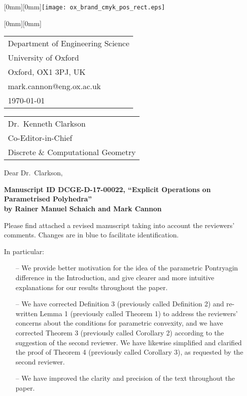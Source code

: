 \documentclass[11pt, a4paper]{article}
\begin{document}
\raisebox{-\height}[0mm][0mm]{\texttt{[image: ox\_brand\_cmyk\_pos\_rect.eps]}}

\hspace{105mm}%
\raisebox{-7.7mm}[0mm][0mm]{\begin{tabular}{@{}l@{}}
Department of Engineering Science\\
University of Oxford\\
Oxford, OX1 3PJ, UK\\
{mark.cannon@eng.ox.ac.uk}
\\
\today\rule{0pt}{25pt}
\end{tabular}}

\vspace{30mm}

\begin{tabular}{@{}l@{}} 
Dr.~Kenneth Clarkson\\
Co-Editor-in-Chief\\
Discrete \& Computational Geometry
\end{tabular}

\vspace{15mm}

\noindent Dear Dr.\ Clarkson,

\textbf{Manuscript ID DCGE-D-17-00022, ``Explicit Operations on Parametrised Polyhedra''\\
by Rainer Manuel Schaich and Mark Cannon}
 
Please find attached a revised manuscript taking into account the reviewers' comments. Changes are in blue to facilitate identification.

In particular:

\begin{itemize}
\item[--] We provide better motivation for the idea of the parametric Pontryagin difference in the Introduction, and give clearer and more intuitive explanations for our results throughout the paper.
\item[--] We have corrected Definition 3 (previously called Definition 2) and re-written Lemma 1 (previously called Theorem 1) to address the reviewers' concerns about the conditions for parametric convexity, and we have corrected Theorem 3 (previously called Corollary 2) according to the suggestion of the second reviewer. We have likewise simplified and clarified the proof of Theorem 4 (previously called Corollary 3), as requested by the second reviewer.
\item[--] We have improved the clarity and precision of the text throughout the paper.
\end{itemize}
\end{document}
